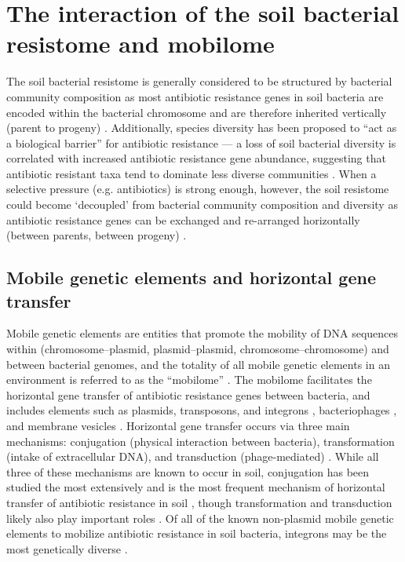 \section{The interaction of the soil bacterial resistome and mobilome}

The soil bacterial resistome is generally considered to be structured by bacterial community composition as most antibiotic resistance genes in soil bacteria are encoded within the bacterial chromosome and are therefore inherited vertically (parent to progeny) \parencite{Dunivin.2019, Forsberg.2014}.
Additionally, species diversity has been proposed to “act as a biological barrier” for antibiotic resistance --- a loss of soil bacterial diversity is correlated with increased antibiotic resistance gene abundance, suggesting that antibiotic resistant taxa tend to dominate less diverse communities \parencite{vanGoethem.2018, Chen.2019c, Vivant.2013}.
When a selective pressure (e.g. antibiotics) is strong enough, however, the soil resistome could become ‘decoupled’ from bacterial community composition and diversity as antibiotic resistance genes can be exchanged and re-arranged horizontally (between parents, between progeny) \parencite{Johnson.2016}.

\subsection{Mobile genetic elements and horizontal gene transfer}

Mobile genetic elements are entities that promote the mobility of DNA sequences within (chromosome–plasmid, plasmid–plasmid, chromosome–chromosome) and between bacterial genomes, and the totality of all mobile genetic elements in an environment is referred to as the “mobilome” \parencite{Partridge.2018, Perry.2013}.
The mobilome facilitates the horizontal gene transfer of antibiotic resistance genes between bacteria, and includes elements such as plasmids, transposons, and integrons \parencite{Partridge.2018}, bacteriophages \parencite{Subirats.2016, ColomerLluch.2011}, and membrane vesicles \parencite{Chattopadhyay.2015}.
Horizontal gene transfer occurs via three main mechanisms:
conjugation (physical interaction between bacteria), transformation (intake of extracellular DNA), and transduction (phage-mediated) \parencite{Partridge.2018}.
While all three of these mechanisms are known to occur in soil, conjugation has been studied the most extensively and is the most frequent mechanism of horizontal transfer of antibiotic resistance in soil \parencite{Perry.2013}, though transformation and transduction likely also play important roles \parencite{Perry.2013, Aminov.2011}.
Of all of the known non-plasmid mobile genetic elements to mobilize antibiotic resistance in soil bacteria, integrons may be the most genetically diverse \parencite{Ghaly.2019}.

